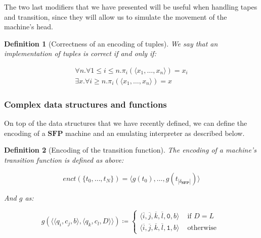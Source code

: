 \documentclass[10pt]{amsart}
\newcommand{\SFP}{\mathbf{SFP}}
\newcommand{\zero}{\mathtt{0}}
\newcommand{\one}{\mathtt{1}}
\newcommand{\QQ}{\mathbb{Q}}
\newcommand{\msi}[1]{q_{#1}}
\newcommand{\mci}[1]{c_{#1}}
\newcommand{\mti}[1]{t{_#1}}
\newcommand{\TT}{\delta_\SFP}
\newtheorem{defn}{Definition}
\begin{document}
The two last modifiers that we have presented will be useful when handling tapes and transition, since they will allow us to simulate the movement of the machine's head.

\begin{defn}[Correctness of an encoding of tuples]
We say that an implementation of tuples is correct if and only if:

\begin{align*}
\forall n.\forall 1\le i \le n. \pi_i(\langle x_1, \ldots, x_n\rangle)= x_i\\
\exists x. \forall i \ge n. \pi_i(\langle x_1, \ldots, x_n\rangle)= x
\end{align*}
\end{defn}

\begin{comment}
\begin{defn}[Belonging test on tuples]
We say that a belonging test on tuples $b$ is correct if and only if:

\begin{align*}
b(x, t)=1 \leftrightarrow t = \langle x_1, x_2, \ldots, x_n\rangle \land \exists i. x_i=x
\end{align*}
\end{defn}
\end{comment}

\subsubsection{Complex data structures and functions}
\label{sec:complexdataandfun}

On top of the data structures that we have recently defined, we can define the encoding of a $\SFP$ machine and an emulating interpreter as described below.

\begin{defn}[Encoding of the transition function]
\label{defn:smencoding}
The encoding of a machine's transition function is defined as above:
\begin{comment}
The encoding of a stream machine is defined as the 4-uple build as follows:
\begin{align*}
\langle \QQ, \Sigma, \TT, \msi i\rangle \mapsto \langle \overline {|\QQ|}, \overline {|\Sigma|}, enct(\TT), \overline {i}\rangle
\end{align*}
\end{comment}
\[
enct(\{\mti 0, \ldots, \mti N\})=\langle g(\mti 0), \ldots, g(\mti {{|\TT|}})\rangle
\]

And $g$ as:

\[
g(\langle \langle \msi i, \mci j, b\rangle, \langle \msi k, \mci l, D\rangle \rangle)\coloneqq\begin{cases}
\langle \overline i, \overline j, \overline k, \overline l, \zero, b\rangle & \text{ if } D=L\\
\langle \overline i, \overline j, \overline k,  \overline l, \one, b\rangle & \text{ otherwise }
\end{cases}
\]
\end{defn}
\end{document}
